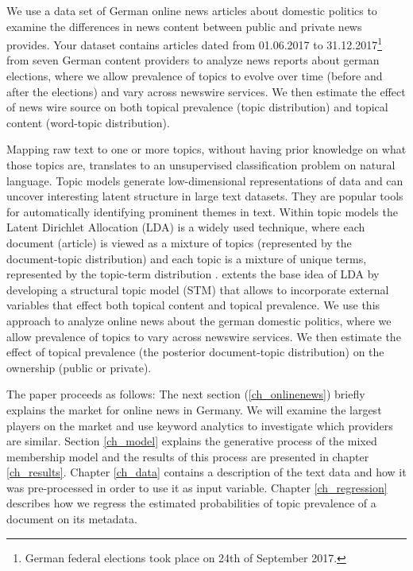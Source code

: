 \documentclass[12pt,a4paper,notitlepage]{article}
\begin{document}
We use a data set of German online news articles about domestic politics to examine the differences in news content between public and private news provides. Your dataset contains articles dated from 01.06.2017 to 31.12.2017\footnote{German federal elections took place on 24th of September 2017.} from seven German content providers to analyze news reports about german elections, where we allow prevalence of topics to evolve over time (before and after the elections) and vary across newswire services. We then estimate the effect of news wire source on both topical prevalence (topic distribution) and topical content (word-topic distribution). 

Mapping raw text to one or more topics, without having prior knowledge on what those topics are, translates to an unsupervised classification problem on natural language. Topic models generate low-dimensional representations of data and can uncover interesting latent structure in large text datasets. They are popular tools for automatically identifying prominent themes in text. Within topic models the Latent Dirichlet Allocation (LDA) is a widely used technique, where each document (article) is viewed as a mixture of topics (represented by the document-topic distribution) and each topic is a mixture of unique terms, represented by the topic-term distribution \citep{blei_latent_2003}. \citet{roberts_model_2016} extents the base idea of LDA by developing a structural topic model (STM) that allows to incorporate external variables that effect both topical content and topical prevalence. We use this approach to analyze online news about the german domestic politics, where we allow prevalence of topics to vary across newswire services. We then estimate the effect of topical prevalence (the posterior document-topic distribution) on the ownership (public or private).

The paper proceeds as follows: The next section (\ref{ch_onlinenews}) briefly explains the market for online news in Germany. We will examine the largest players on the market and use keyword analytics to investigate which providers are similar. Section \ref{ch_model} explains the generative process of the mixed membership model and the results of this process are presented in chapter \ref{ch_results}. Chapter \ref{ch_data} contains a description of the text data and how it was pre-processed in order to use it as input variable. Chapter \ref{ch_regression} describes how we regress the estimated probabilities of topic prevalence of a document on its metadata.
\end{document}
